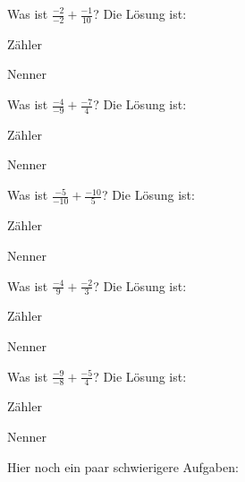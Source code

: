 \documentclass{ximera}
\begin{document}
\begin{shuffle}
\begin{question}
Was ist $\frac{-2}{-2} + \frac{-1}{10}$?
Die Lösung ist:
\begin{solution}
Zähler 
\end{solution}
\begin{solution}
Nenner 
\end{solution}
\end{question}


\begin{question}
Was ist $\frac{-4}{-9} + \frac{-7}{4}$?
Die Lösung ist:
\begin{solution}
Zähler 
\end{solution}
\begin{solution}
Nenner 
\end{solution}
\end{question}


\begin{question}
Was ist $\frac{-5}{-10} + \frac{-10}{5}$?
Die Lösung ist:
\begin{solution}
Zähler 
\end{solution}
\begin{solution}
Nenner 
\end{solution}
\end{question}


\begin{question}
Was ist $\frac{-4}{9} + \frac{-2}{3}$?
Die Lösung ist:
\begin{solution}
Zähler 
\end{solution}
\begin{solution}
Nenner 
\end{solution}
\end{question}


\begin{question}
Was ist $\frac{-9}{-8} + \frac{-5}{4}$?
Die Lösung ist:
\begin{solution}
Zähler 
\end{solution}
\begin{solution}
Nenner 
\end{solution}
\end{question}

\end{shuffle}


Hier noch ein paar schwierigere Aufgaben:
\end{document}
